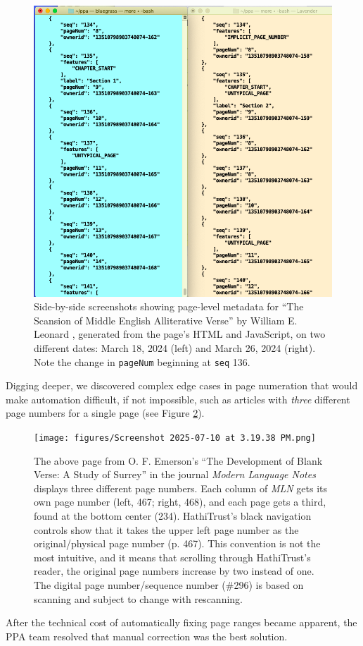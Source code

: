 \documentclass[final]{anthology-ch} %
\begin{document}
\begin{figure}
    \centering
    \includegraphics[width=0.5\linewidth]{figures/y.png}
    \caption{Side-by-side screenshots showing page-level metadata for ``The Scansion of Middle English Alliterative Verse'' by William E. Leonard \cite{noauthor_scansion_nodate}, generated from the page's HTML and JavaScript, on two different dates: March 18, 2024 (left) and March 26, 2024 (right). Note the change in \texttt{pageNum} beginning at \texttt{seq} 136.}
    \label{fig:code-comparison}
\end{figure}

Digging deeper, we discovered complex edge cases in page numeration that would make automation difficult, if not impossible, such as articles with \textit{three} different page numbers for a single page (see Figure \ref{fig:MLN}).

\begin{figure}
    \centering
    \texttt{[image: figures/Screenshot 2025-07-10 at 3.19.38 PM.png]}
    \caption{The above page from O. F. Emerson’s ``The Development of Blank Verse: A Study of Surrey'' in the journal \textit{Modern Language Notes} \cite{emerson_o_f_development_1889} displays three different page numbers. Each column of \textit{MLN }gets its own page number (left, 467; right, 468), and each page gets a third, found at the bottom center (234). HathiTrust's black navigation controls show that it takes the upper left page number as the original/physical page number (p. 467). This convention is not the most intuitive, and it means that scrolling through HathiTrust's reader, the original page numbers increase by two instead of one. The digital page number/sequence number (\#296) is based on scanning and subject to change with rescanning.}
    \label{fig:MLN}
\end{figure}

After the technical cost of automatically fixing page ranges became apparent, the PPA team resolved that manual correction was the best solution.
\end{document}
